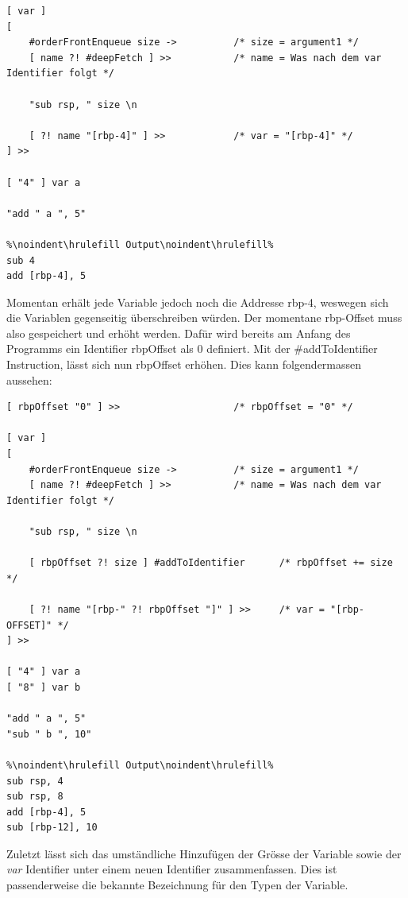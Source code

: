 \begin{lstlisting}[language=QHS, caption=Definition einer Variable mit \textit{var} Identifier]
[ var ]
[
    #orderFrontEnqueue size ->          /* size = argument1 */
    [ name ?! #deepFetch ] >>           /* name = Was nach dem var Identifier folgt */

    "sub rsp, " size \n

    [ ?! name "[rbp-4]" ] >>            /* var = "[rbp-4]" */
] >> 

[ "4" ] var a 

"add " a ", 5"
    
%\noindent\hrulefill Output\noindent\hrulefill%
sub 4
add [rbp-4], 5
\end{lstlisting}

Momentan erhält jede Variable jedoch noch die Addresse rbp-4, weswegen sich die Variablen gegenseitig überschreiben würden. Der momentane rbp-Offset muss also gespeichert und erhöht werden.
Dafür wird bereits am Anfang des Programms ein Identifier rbpOffset als 0 definiert. Mit der \#addToIdentifier Instruction, lässt sich nun rbpOffset erhöhen. Dies kann folgendermassen aussehen:

\begin{minipage}{\linewidth}
\begin{lstlisting}[language=QHS, caption=Definition einer Variable mit rbpOffset]
[ rbpOffset "0" ] >>                    /* rbpOffset = "0" */

[ var ]
[
    #orderFrontEnqueue size ->          /* size = argument1 */
    [ name ?! #deepFetch ] >>           /* name = Was nach dem var Identifier folgt */

    "sub rsp, " size \n

    [ rbpOffset ?! size ] #addToIdentifier      /* rbpOffset += size */

    [ ?! name "[rbp-" ?! rbpOffset "]" ] >>     /* var = "[rbp-OFFSET]" */
] >> 

[ "4" ] var a 
[ "8" ] var b 

"add " a ", 5"
"sub " b ", 10"
    
%\noindent\hrulefill Output\noindent\hrulefill%
sub rsp, 4
sub rsp, 8
add [rbp-4], 5
sub [rbp-12], 10
\end{lstlisting}
\end{minipage}

Zuletzt lässt sich das umständliche Hinzufügen der Grösse der Variable sowie der \textit{var} Identifier unter einem neuen Identifier zusammenfassen. Dies ist passenderweise die bekannte Bezeichnung für den Typen der Variable.

